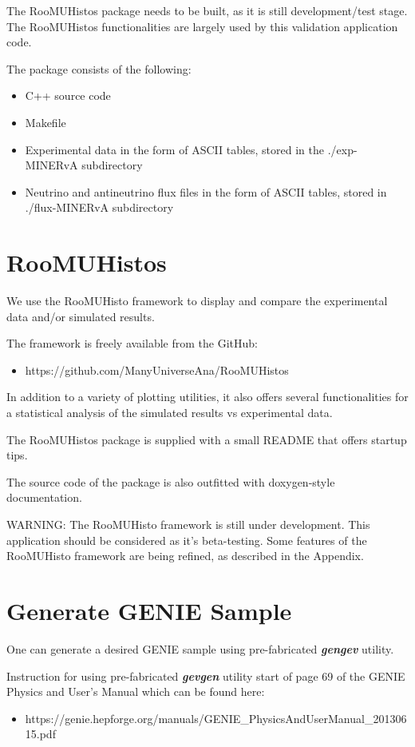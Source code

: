The RooMUHistos package needs to be built, as it is still development/test stage. \\
The RooMUHistos functionalities are largely used by this validation application code.

The package consists of the following:
\begin{itemize}
\item{C++ source code}
\item{Makefile}
\item{Experimental data in the form of ASCII tables, stored in the ./exp-MINERvA subdirectory}
\item{Neutrino and antineutrino flux files in the form of ASCII tables, stored in ./flux-MINERvA subdirectory}
\end{itemize}

\section{RooMUHistos}

We use the RooMUHisto framework to display and compare the experimental data and/or simulated results.

The framework is freely available from the GitHub:
\begin{itemize}
\item{https://github.com/ManyUniverseAna/RooMUHistos}
\end{itemize}

In addition to a variety of plotting utilities, it also offers several functionalities for a statistical 
analysis of the simulated results vs experimental data.

The RooMUHistos package is supplied with a small README that offers startup tips.

The source code of the package is also outfitted with doxygen-style documentation.

WARNING: The RooMUHisto framework is still under development. This application should be considered as
it's beta-testing. Some features of the RooMUHisto framework are being refined, as described in the Appendix.

\section{Generate GENIE Sample}

One can generate a desired GENIE sample using pre-fabricated { \bf \it gengev } utility.

Instruction for using pre-fabricated { \bf \it gevgen} utility start of page 69 of 
the GENIE Physics and User's Manual which can be found here:
\begin{itemize}
\item{https://genie.hepforge.org/manuals/GENIE\_PhysicsAndUserManual\_20130615.pdf}
\end{itemize}

